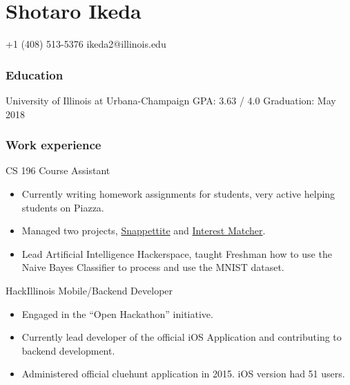 \documentclass{tccv}
\begin{document}
\part{Shotaro Ikeda}

{+1 (408) 513-5376}
{ikeda2@illinois.edu}

\section{Education}

\begin{yearlist}

  {University of Illinois at  \newline Urbana-Champaign}
  {GPA: 3.63 / 4.0}
  {Graduation: May 2018}

\end{yearlist}

\section{Work experience}

\begin{eventlist}

  {CS 196}
  {Course Assistant}

  \begin{itemize}
  \item Currently writing homework assignments for students, very active helping students on Piazza.
  \item Managed two projects, \href{https://github.com/SNAPPETITE}{Snappettite} and \href{https://github.com/InterestMatcher}{Interest Matcher}.
  \item Lead Artificial Intelligence Hackerspace, taught Freshman how to use the Naive Bayes Classifier to process and use the MNIST dataset.
  \end{itemize}

  {HackIllinois}
  {Mobile/Backend Developer}
  \begin{itemize}
  \item Engaged in the ``Open Hackathon'' initiative.
  \item Currently lead developer of the official iOS Application and contributing to \\
    backend development.
  \item Administered official cluehunt application in 2015. iOS version had 51 users.
  \end{itemize}

\end{eventlist}
\end{document}
